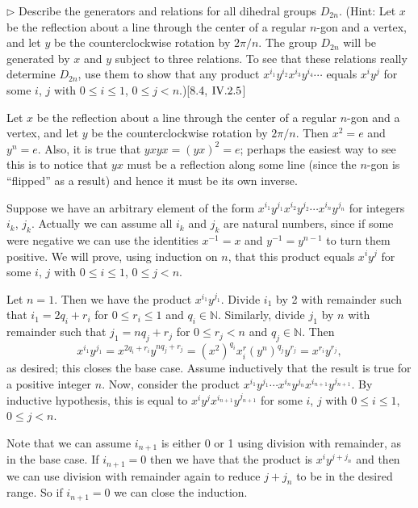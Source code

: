\begin{exercise}
	$\triangleright$ Describe the generators and relations for all dihedral groups $D_{2n}$. (Hint: Let $x$ be the reflection about a line through the center of a regular $n$-gon and a vertex, and let $y$ be the counterclockwise rotation by $2\pi/n$. The group $D_{2n}$ will be generated by $x$ and $y$ subject to three relations. To see that these relations really determine $D_{2n}$, use them to show that any product $x^{i_1} y^{i_2}x^{i_3}y^{i_4}\cdots$ equals $x^iy^j$ for some $i$, $j$ with $0 \leq i \leq 1$, $0\leq j < n$.)[8.4, $\RNo{4}.2.5$]
\end{exercise}
\begin{solution}
	Let $x$ be the reflection about a line through the center of a regular $n$-gon and a vertex, and let $y$ be the counterclockwise rotation by $2\pi/n$. Then $x^2 = e$ and $y^n = e$. Also, it is true that $yxyx= (yx)^2=e$; perhaps the easiest way to see this is to notice that $yx$ must be a reflection along some line (since the $n$-gon is ``flipped'' as a result) and hence it must be its own inverse.
	
	Suppose we have an arbitrary element of the form $x^{i_1}y^{j_1}x^{i_2}y^{j_2}\cdots x^{i_n}y^{j_n}$ for integers $i_k$, $j_k$. Actually we can assume all $i_k$ and $j_k$ are natural numbers, since if some were negative we can use the identities $x^{-1} = x$ and $y^{-1} = y^{n-1}$ to turn them positive. We will prove, using induction on $n$, that this product equals $x^iy^j$ for some $i$, $j$ with $0 \leq i \leq 1$, $0\leq j < n$.
	
	Let $n = 1$. Then we have the product $x^{i_1}y^{j_1}$. Divide $i_1$ by 2 with remainder such that $i_1 = 2q_i + r_i$ for $0\leq r_i \leq 1$ and $q_i\in \mathbb{N}$. Similarly, divide $j_1$ by $n$ with remainder such that $j_1 = nq_j + r_j$ for $0\leq r_j < n$ and $q_j\in \mathbb{N}$. Then 
	\[
		x^{i_1}y^{j_1} = x^{2q_i + r_i} y^{nq_j + r_j} = (x^2)^{q_i}x^r_i (y^n)^{q_j}y^{r_j} = x^{r_i}y^{r_j},
	\]
	as desired; this closes the base case. Assume inductively that the result is true for a positive integer $n$. Now, consider the product $x^{i_1}y^{j_1}\cdots x^{i_n}y^{j_n}x^{i_{n+1}}y^{j_{n+1}}$. By inductive hypothesis, this is equal to $x^iy^jx^{i_{n+1}}y^{j_{n+1}}$ for some $i$, $j$ with $0 \leq i \leq 1$, $0\leq j < n$.
	
	Note that we can assume $i_{n+1}$ is either 0 or 1 using division with remainder, as in the base case. If $i_{n+1} = 0$ then we have that the product is $x^iy^{j+j_n}$ and then we can use division with remainder again to reduce $j+j_n$ to be in the desired range. So if $i_{n+1} = 0$ we can close the induction.
	

\end{solution}
